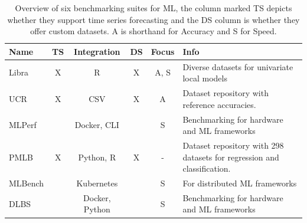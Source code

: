 \begin{table}[h]
  \begin{tabularx}{\textwidth}{|l|c|c|c|c|X|}
    \hline
    Name    & TS & Integration    & DS & Focus & Info                                                                    \\
    \hline
    \hline
    Libra   & X  & R              & X  & A, S  & Diverse datasets for univariate local models                            \\
    \hline
    UCR     & X  & CSV            & X  & A     & Dataset repository with reference accuracies.                           \\
    \hline
    MLPerf  &    & Docker, CLI    &    & S     & Benchmarking for hardware and ML frameworks                             \\
    \hline
    PMLB    & X  & Python, R      & X  & -     & Dataset repository with 298 datasets for regression and classification. \\
    \hline
    MLBench &    & Kubernetes     &    & S     & For distributed ML frameworks                                           \\
    \hline
    DLBS    &    & Docker, Python &    & S     & Benchmarking for hardware and ML frameworks                             \\
    \hline
  \end{tabularx}
  \caption{Overview of six benchmarking suites for ML, the column marked TS depicts whether they support time series forecasting and the DS column is whether they offer custom datasets. A is shorthand for  Accuracy and S for Speed.}
  \label{tab:benchmarking_suites}
\end{table}


